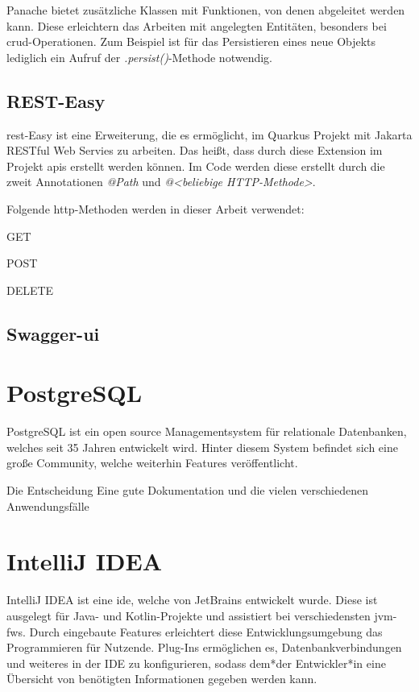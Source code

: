 Panache bietet zusätzliche Klassen mit Funktionen, von denen abgeleitet werden kann. 
Diese erleichtern das Arbeiten mit angelegten Entitäten, besonders bei \gls{crud}-Operationen.
Zum Beispiel ist für das Persistieren eines neue Objekts lediglich ein Aufruf der \emph{.persist()}-Methode notwendig.
\cite{HibernateORMwithPanache}

\subsection{REST-Easy}
\gls{rest}-Easy ist eine Erweiterung, die es ermöglicht, im Quarkus Projekt mit Jakarta RESTful Web Servies zu arbeiten. 
Das heißt, dass durch diese Extension im Projekt \gls{api}s erstellt werden können. 
Im Code werden diese erstellt durch die zweit Annotationen \emph{@Path} und \emph{@<beliebige HTTP-Methode>}.

Folgende \gls{http}-Methoden werden in dieser Arbeit verwendet:
\begin{compactitem}
    \item GET
    \item POST 
    \item DELETE
\end{compactitem}

\subsection{Swagger-ui}


\section{PostgreSQL}
PostgreSQL ist ein open source Managementsystem für relationale Datenbanken, welches seit 35 Jahren entwickelt wird. 
Hinter diesem System befindet sich eine große Community, welche weiterhin Features veröffentlicht. 

Die Entscheidung  Eine gute Dokumentation und die vielen verschiedenen Anwendungsfälle 
\cite{PostgreSQLAbout}


\section{IntelliJ IDEA}
IntelliJ IDEA ist eine \gls{ide}, welche von JetBrains entwickelt wurde. 
Diese ist ausgelegt für Java- und Kotlin-Projekte und assistiert bei verschiedensten \gls{jvm}-\glspl{fw}. 
Durch eingebaute Features erleichtert diese Entwicklungsumgebung das Programmieren für Nutzende. 
Plug-Ins ermöglichen es, Datenbankverbindungen und weiteres in der IDE zu konfigurieren, sodass dem*der Entwickler*in eine Übersicht von benötigten Informationen gegeben werden kann.
\cite{IntelliJIDEA}

